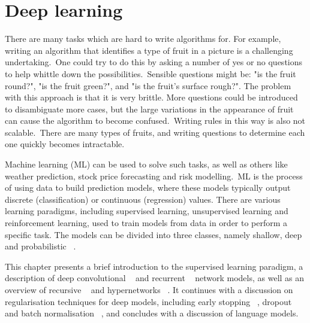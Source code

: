 
\chapter{Deep learning}

\ifpdf
     \graphicspath{{Figs/Chapter2/}}
\else
    \graphicspath{{Chapter2/Figs/Vector/}{Chapter2/Figs/}}
\fi


There are many tasks which are hard to write algorithms for. For example, writing an algorithm that identifies a type of fruit in a picture is a challenging undertaking.\ One could try to do this by asking a number of yes or no questions to help whittle down the possibilities.\ Sensible questions might be: "is the fruit round?", "is the fruit green?", and "is the fruit's surface rough?". The problem with this approach is that it is very brittle. More questions could be introduced to disambiguate more cases, but the large variations in the appearance of fruit can cause the algorithm to become confused.\ Writing rules in this way is also not scalable.\ There are many types of fruits, and writing questions to determine each one quickly becomes intractable. \par
 
\noindent Machine learning (ML) can be used to solve such tasks, as well as others like weather prediction, stock price forecasting and risk modelling.\ ML is the process of using data to build prediction models, where these models typically output discrete (classification) or continuous (regression) values. There are various learning paradigms, including supervised learning, unsupervised learning and reinforcement learning, used to train models from data in order to perform a specific task. The models can be divided into three classes, namely shallow, deep and probabilistic \unskip ~\citep{hastie2009elements}. \par

\noindent This chapter presents a brief introduction to the supervised learning paradigm, a description of deep convolutional \unskip ~\citep{lecun1998gradient} and recurrent \unskip ~\citep{werbos1988generalization} network models, as well as an overview of recursive \unskip ~\citep{pollack1990recursive}  and hypernetworks \unskip~\citep{ha2016hypernetworks}. It continues with a discussion on regularisation techniques for deep models, including early stopping \unskip~\citep{prechelt1998early}, dropout \unskip ~\citep{srivastava2014dropout} and batch normalisation \unskip ~\citep{ioffe2015batch}, and concludes with a discussion of language models. 


